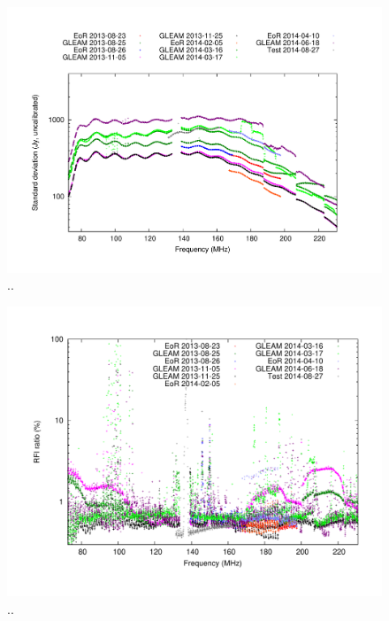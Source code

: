 \documentclass[useAMS,usenatbib]{mn2e}
\begin{document}
\noindent\begin{figure}
\begin{center}\hspace*{-0.2cm}\includegraphics[width=18cm]{img/plot-stddev-per-set}\vspace{-1cm}
\caption{..}
\label{fig:stddev-per-set}
\end{center}
\end{figure}

\noindent\begin{figure}
\begin{center}\hspace*{-0.2cm}\includegraphics[width=18cm]{img/plot-rfi-per-set}\vspace{-1cm}
\caption{..}
\label{fig:rfi-per-set}
\end{center}
\end{figure}
\end{document}
